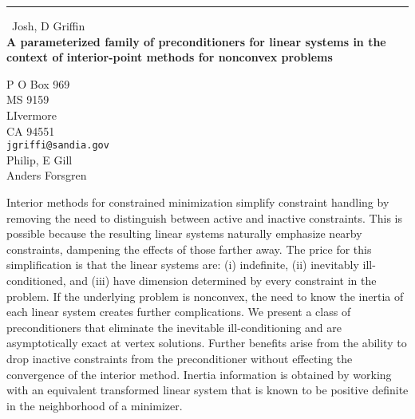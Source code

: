 \documentclass{report}
\begin{document}
\begin{center}
\rule{6in}{1pt} \
{\large Josh, D Griffin \\
{\bf A parameterized family of preconditioners for linear systems in the context of interior-point methods for nonconvex problems}}

P O Box 969 \\ MS 9159 \\ LIvermore \\ CA 94551
\\
{\tt jgriffi@sandia.gov}\\
Philip, E Gill\\
Anders Forsgren\end{center}

Interior methods for constrained minimization simplify constraint
handling by removing the need to distinguish between active and inactive
constraints. This is possible because the resulting linear systems
naturally emphasize nearby constraints, dampening the effects of those
farther away. The price for this simplification is that the linear
systems are: (i) indefinite, (ii)
inevitably ill-conditioned, and (iii) have dimension determined by every
constraint in the problem. If the underlying problem is nonconvex, the
need to know the inertia of each linear system creates further
complications. We present a class of preconditioners that eliminate the
inevitable ill-conditioning and are asymptotically exact at vertex
solutions. Further benefits arise from the ability to drop inactive
constraints from the preconditioner without effecting the convergence of
the interior method. Inertia information is obtained by working with an
equivalent transformed linear system that is known to be positive
definite in the neighborhood of a minimizer.
\end{document}
